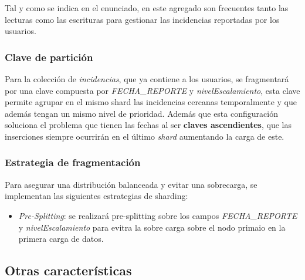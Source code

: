 \documentclass[]{article}
\begin{document}
Tal y como se indica en el enunciado, en este agregado son frecuentes tanto las lecturas como las escrituras para gestionar las incidencias reportadas por los usuarios.
\subsubsection{Clave de partición}
\label{subsubsec:particion_incidencias}
Para la colección de \textit{incidencias}, que ya contiene a los usuarios, se fragmentará por una clave compuesta por \textit{FECHA\_REPORTE} y \textit{nivelEscalamiento}, esta clave permite agrupar en el mismo shard las incidencias cercanas temporalmente y que además tengan un mismo nivel de prioridad. Además que esta configuración soluciona el problema que tienen las fechas al ser \textbf{claves ascendientes}, que las inserciones siempre ocurrirán en el último \textit{shard} aumentando la carga de este.

\subsubsection{Estrategia de fragmentación}
\label{subsubsec:fragmentacion_incidencias}

Para asegurar una distribución balanceada y evitar una sobrecarga, se implementan las siguientes estrategias de sharding:
\begin{itemize}
    \item \textit{Pre-Splitting}: se realizará pre-splitting sobre los campos \textit{FECHA\_REPORTE} y \textit{nivelEscalamiento} para evitra la sobre carga sobre el nodo primaio en la primera carga de datos.
\end{itemize}

\subsection{Otras características}
\label{subsec:others}
\end{document}
